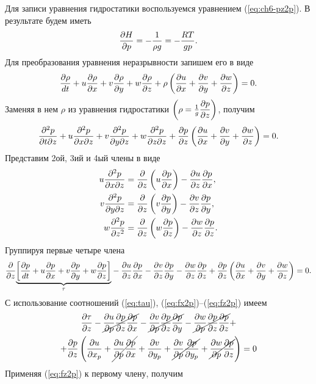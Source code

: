     Для записи уравнения гидростатики воспользуемся уравнением (\ref{eq:ch6-pz2p}). В результате будем иметь
    \begin{equation}
        \label{ch6:DwDt2p}
        \pd{H}{p}=-\frac{1}{\rho g}=-\frac{RT}{gp}.
    \end{equation}
    Для преобразования уравнения неразрывности запишем его в виде
    \begin{equation*}
        \fd{\rho} + \rho \left( \pd{u}{x} + \pd{v}{y} + \pd{w}{z} \right) = 0.
    \end{equation*}
    Заменяя в нем $\rho$ из уравнения гидростатики $\left( \rho=\frac{1}{g} \pd{p}{z} \right)$, получим
    \begin{equation*}
        \frac{\partial^2 p}{\partial t \partial z} +
        u\frac{\partial^2 p}{\partial x \partial z} +
        v\frac{\partial^2 p}{\partial y \partial z} +
        w\frac{\partial^2 p}{\partial z \partial z} +
        \pd{p}{z} \left( \pd{u}{x} + \pd{v}{y} + \pd{w}{z} \right) = 0.
    \end{equation*}
    Представим 2ой, 3ий и 4ый члены в виде
    \begin{align*}
        u\frac{\partial^2 p}{\partial x \partial z} &= \pd{}{z} \left( u\pd{p}{x} \right) - \pd{u}{z}\pd{p}{x}, \\
        v\frac{\partial^2 p}{\partial y \partial z} &= \pd{}{z} \left( v\pd{p}{y} \right) - \pd{v}{z}\pd{p}{y}, \\
        w\frac{\partial^2 p}{\partial z^2} &= \pd{}{z} \left( w\pd{p}{z} \right) - \pd{w}{z}\pd{p}{z}.
    \end{align*}
    Группируя первые четыре члена
    \begin{align*}
        \pd{}{z} {\underbrace{\left[ \fd{p} \right]}_{\tau}} - \pd{u}{z}\pd{p}{x}-\pd{v}{z}\pd{p}{y}-\pd{w}{z}\pd{p}{z}+\pd{p}{z} \left( \pd{u}{x} + \pd{v}{y} + \pd{w}{z} \right) = 0.
    \end{align*}
   С использование соотношений (\ref{eq:tau}), (\ref{eq:fx2p})--(\ref{eq:fz2p}) имеем
   \begin{multline*}
       \pd{\tau}{z}-
       \cancel{\pd{u}{p}\pd{p}{z}\pd{p}{x}}-
       \cancel{\pd{v}{p}\pd{p}{z}\pd{p}{y}}-
       \cancel{\pd{w}{p}\pd{p}{z}\pd{p}{z}}+ \\
     + \pd{p}{z} \left( \pd{u}{x_p} + \cancel{\pd{u}{p}\pd{p}{x}} + 
     \pd{v}{y_p} + \cancel{\pd{v}{p}\pd{p}{y_p}}+\cancel{\pd{w}{p}\pd{p}{z}} \right) = 0
   \end{multline*}
   Применяя (\ref{eq:fz2p}) к первому члену, получим
